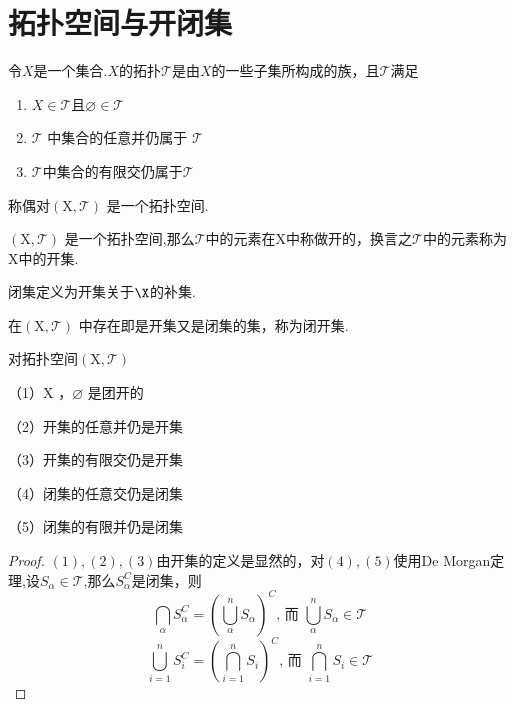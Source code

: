 \section{拓扑空间与开闭集}
\begin{definition}\label{defoftosp}
	令$X$是一个集合.$X$的拓扑$\mathcal{T}$是由$X$的一些子集所构成的族，且$\mathcal{T}$满足
	\begin{enumerate}
		\item $X\in \mathcal{T}$且$\varnothing\in\mathcal{T}$
		\item $\mathcal{T}$ 中集合的任意并仍属于 $\mathcal{T}$
		\item $\mathcal{T}$中集合的有限交仍属于$\mathcal{T}$
	\end{enumerate}
	称偶对$\left(\mathrm{X}, \mathcal{T}\right)$ 是一个拓扑空间.
\end{definition}
\begin{definition}
	$\left(\mathrm{X}, \mathcal{T}\right)$ 是一个拓扑空间,那么$\mathcal{T}$中的元素在$\mathrm{X}$中称做开的，换言之$\mathcal{T}$中的元素称为$\mathrm{X}$中的开集.
	
	闭集定义为开集关于$\X$的补集.
	
	在$\left(\mathrm{X}, \mathcal{T}\right)$ 中存在即是开集又是闭集的集，称为闭开集.
\end{definition}
\begin{proposition}
	对拓扑空间$\left(\mathrm{X}, \mathcal{T}\right)$
	
	（1）$\mathrm{X}$ ，$\varnothing$ 是团开的
	
	（2）开集的任意并仍是开集
	
	（3）开集的有限交仍是开集
	
	（4）闭集的任意交仍是闭集
	
	（5）闭集的有限并仍是闭集
\end{proposition}
\begin{proof}
	$(1),(2),(3)$由开集的定义是显然的，对$(4),(5)$使用De Morgan定理,设$S_{\alpha}\in\mathcal{T}$,那么$S_{\alpha}^C$是闭集，则
	$$\bigcap_\alpha S_\alpha^C=\left(\bigcup_\alpha^n S_\alpha\right)^C \text {, 而 }\bigcup_\alpha^n S_\alpha  \in \mathcal{T}$$
	$$	\bigcup_{i=1}^n S_i^C=\left(\bigcap_{i=1}^n S_i\right)^C \text {, 而 } \bigcap_{i=1}^n S_i \in \mathcal{T}$$
\end{proof}
